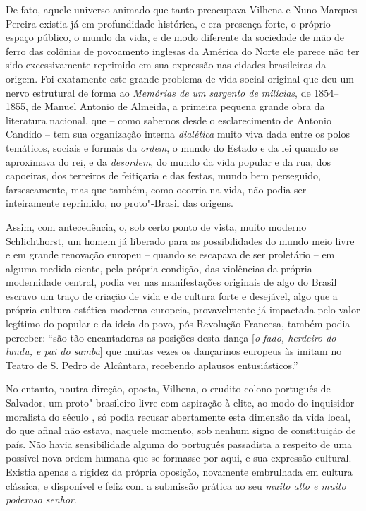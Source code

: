 De fato, aquele universo animado que tanto preocupava Vilhena e Nuno
Marques Pereira existia já em profundidade histórica, e era presença
forte, o próprio espaço público, o mundo da vida, e de modo diferente da
sociedade de mão de ferro das colônias de povoamento inglesas da América
do Norte ele parece não ter sido excessivamente reprimido em sua
expressão nas cidades brasileiras da origem. Foi exatamente este grande
problema de vida social original que deu um nervo estrutural de forma ao
\emph{Memórias de um sargento de milícias}, de 1854--1855, de Manuel
Antonio de Almeida, a primeira pequena grande obra da literatura
nacional, que -- como sabemos desde o esclarecimento de Antonio Candido
-- tem sua organização interna \emph{dialética} muito viva dada entre os
polos temáticos, sociais e formais da \emph{ordem}, o mundo do Estado e
da lei quando se aproximava do rei, e da \emph{desordem}, do mundo da
vida popular e da rua, dos capoeiras, dos terreiros de feitiçaria e das
festas, mundo bem perseguido, farsescamente, mas que também, como
ocorria na vida, não podia ser inteiramente reprimido, no proto"-Brasil
das origens.

Assim, com antecedência, o, sob certo ponto de vista, muito moderno
Schlichthorst, um homem já liberado para as possibilidades do mundo meio
livre e em grande renovação europeu -- quando se escapava de ser
proletário -- em alguma medida ciente, pela própria condição, das
violências da própria modernidade central, podia ver nas manifestações
originais de algo do Brasil escravo um traço de criação de vida e de
cultura forte e desejável, algo que a própria cultura estética moderna
europeia, provavelmente já impactada pelo valor legítimo do popular e da
ideia do povo, pós Revolução Francesa, também podia perceber: ``são tão
encantadoras as posições desta dança {[}\emph{o fado, herdeiro do lundu,
e pai do samba}{]} que muitas vezes os dançarinos europeus às imitam no
Teatro de S. Pedro de Alcântara, recebendo aplausos entusiásticos.''

No entanto, noutra direção, oposta, Vilhena, o erudito colono português
de Salvador, um proto"-brasileiro livre com aspiração à elite, ao modo do
inquisidor moralista do século , só podia recusar abertamente esta
dimensão da vida local, do que afinal não estava, naquele momento, sob
nenhum signo de constituição de país. Não havia sensibilidade alguma do
português passadista a respeito de uma possível nova ordem humana que se
formasse por aqui, e sua expressão cultural. Existia apenas a rigidez da
própria oposição, novamente embrulhada em cultura clássica, e disponível
e feliz com a submissão prática ao seu \emph{muito alto e muito poderoso
senhor}.

